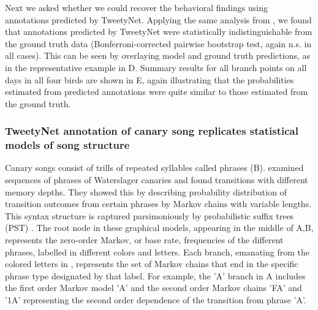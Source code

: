 \documentclass[9pt,lineno]{elife}
\begin{document}
Next we asked whether we could recover the behavioral findings using annotations predicted by TweetyNet. 
Applying the same analysis from \cite{warren_variable_2012}, 
we found that annotations predicted by TweetyNet 
were statistically indistinguishable 
from the ground truth data (Bonferroni-corrected pairwise bootstrap test, again n.s. in all cases).
This can be seen by overlaying model and ground truth predictions, 
as in the representative example in D. 
Summary results for all branch points on all days in all four birds are shown in E, 
again illustrating that the probabilities estimated from predicted annotations 
were quite similar to those estimated from the ground truth.

\subsubsection{TweetyNet annotation of canary song replicates statistical models of song structure}
\label{results:canary-syntax}
Canary songs consist of trills of repeated syllables called phrases 
(B).
\cite{markowitz_long-range_2013} examined sequences of phrases of Waterslager canaries and found 
transitions with different memory depths.
They showed this by describing probability distribution of transition outcomes from certain phrases 
by Markov chains with variable lengths. 
This syntax structure is captured parsimoniously by probabilistic suffix trees (PST) \citep{ron_power_1996}. 
The root node in these graphical models, appearing in the middle of A,B,
represents the zero-order Markov, or base rate, frequencies of the different phrases, labelled in different colors and letters. 
Each branch, emanating from the colored letters in , 
represents the set of Markov chains that end in the specific phrase type designated by that label. 
For example, the 'A' branch in A includes the first order Markov model 'A' 
and the second order Markov chains 'FA' and '1A' representing the second order dependence of the transition from phrase 'A'.
\end{document}
